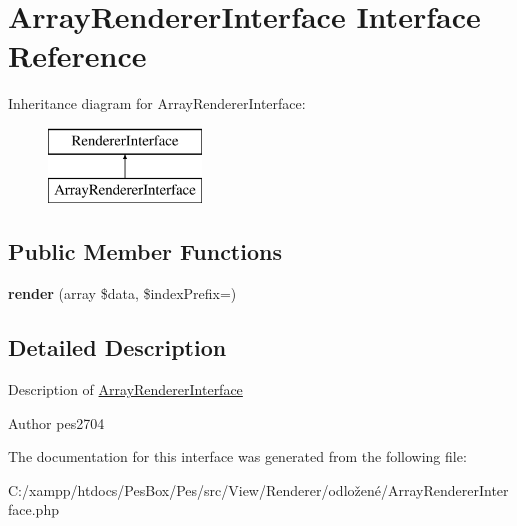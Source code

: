 \hypertarget{interface_pes_1_1_view_1_1_renderer_1_1_array_renderer_interface}{}\section{Array\+Renderer\+Interface Interface Reference}
\label{interface_pes_1_1_view_1_1_renderer_1_1_array_renderer_interface}
Inheritance diagram for Array\+Renderer\+Interface\+:\begin{figure}[H]
\begin{center}
\leavevmode
\includegraphics[height=2.000000cm]{interface_pes_1_1_view_1_1_renderer_1_1_array_renderer_interface}
\end{center}
\end{figure}
\subsection*{Public Member Functions}
\begin{DoxyCompactItemize}
\item 
\mbox{\label{interface_pes_1_1_view_1_1_renderer_1_1_array_renderer_interface_ab49e12290ffdf3aefdf6fc411381d012}} 
{\bfseries render} (array \$data, \$index\+Prefix=\textquotesingle{}\textquotesingle{})
\end{DoxyCompactItemize}


\subsection{Detailed Description}
Description of \mbox{\hyperlink{interface_pes_1_1_view_1_1_renderer_1_1_array_renderer_interface}{Array\+Renderer\+Interface}}

\begin{DoxyAuthor}{Author}
pes2704 
\end{DoxyAuthor}


The documentation for this interface was generated from the following file\+:\begin{DoxyCompactItemize}
\item 
C\+:/xampp/htdocs/\+Pes\+Box/\+Pes/src/\+View/\+Renderer/odložené/Array\+Renderer\+Interface.\+php\end{DoxyCompactItemize}
